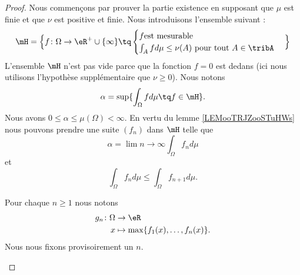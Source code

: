 \begin{proof}
	Nous commençons par prouver la partie existence en supposant que \( \mu\) est finie et que \( \nu\) est positive et finie. Nous introduisons l'ensemble suivant :
	\begin{equation}
		\mH=\Big\{
		f \colon \Omega\to \eR^+\cup\{ \infty \} \tq
		\begin{cases}
			f                       \text{est mesurable } \\
			\int_Afd\mu\leq \nu(A)  \text{ pour tout  }A\in\tribA
		\end{cases}
		\Big\}
	\end{equation}
	L'ensemble \( \mH\) n'est pas vide parce que la fonction \( f=0\) est dedans (ici nous utilisons l'hypothèse supplémentaire que \( \nu\geq 0\)). Nous notons
	\begin{equation}
		\alpha=\sup\{ \int_{\Omega}fd\mu\tq f\in\mH \}.
	\end{equation}
	Nous avons \( 0\leq \alpha\leq \mu(\Omega)<\infty\). En vertu du lemme \ref{LEMooTRJZooSTuHWs} nous pouvons prendre une suite \( (f_n)\) dans \( \mH\) telle que
	\begin{equation}
		\alpha=\lim{n\to\infty }\int_{\Omega}f_nd\mu
	\end{equation}
	et
	\begin{equation}
		\int_{\Omega}f_nd\mu\leq \int_{\Omega}f_{n+1}d\mu.
	\end{equation}

	\begin{subproof}

		Pour chaque \( n\geq 1\) nous notons
		\begin{equation}
			\begin{aligned}
				g_n\colon \Omega & \to \eR                                  \\
				x                & \mapsto \max\{ f_1(x),\ldots, f_n(x) \}.
			\end{aligned}
		\end{equation}
		Nous nous fixons provisoirement un \( n\).

		\spitem[\( g_n\in \mH\)]


\end{subproof}
\end{proof}
